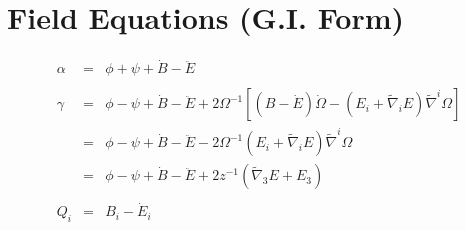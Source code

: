 \documentclass[10pt,letterpaper]{article}
\numberwithin{equation}{section}
\begin{document}
\section{Field Equations (G.I. Form)}
\begin{eqnarray}
\alpha &=& \phi +\psi+\dot B - \ddot E 
\\ \nonumber\\
\gamma &=& \phi-\psi +\dot B - \ddot E+2\Omega^{-1}\left[(B-\dot E)\dot\Omega-(E_i+\tilde\nabla_i E)\tilde\nabla^i\Omega\right]
\nonumber\\
&=& \phi-\psi +\dot B - \ddot E-2\Omega^{-1}(E_i+\tilde\nabla_i E)\tilde\nabla^i\Omega
\nonumber\\
&=& \phi -\psi + \dot B - \ddot E + 2z^{-1}(\tilde\nabla_3 E + E_3)
\\ \nonumber\\
Q_i &=& B_i-\dot E_i
\end{eqnarray}
%
\end{document}
